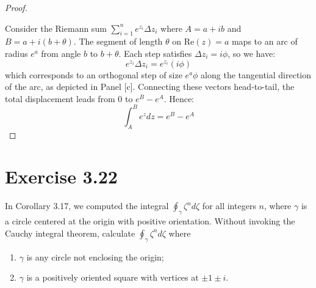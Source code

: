 \documentclass{article}
\begin{document}
\begin{proof}
\begin{center}
  \end{center}

  \vspace{1em}

  Consider the Riemann sum $\sum_{i=1}^{n} e^{z_i}\Delta z_i$ where
  $A = a+ib$ and $B = a+i(b+\theta)$. The segment of length
  $\theta$ on $\text{Re}(z) = a$ maps to an arc of radius $e^a$
  from angle $b$ to $b+\theta$. Each step satisfies $\Delta z_i =
  i\phi$, so we have:
  \[
    e^{z_i}\Delta z_i = e^{z_i}(i\phi)
  \]
  which corresponds to an orthogonal step of size $e^a\phi$ along
  the tangential direction of the arc, as depicted in Panel [c].
  Connecting these vectors head-to-tail, the total displacement
  leads from $0$ to $e^B - e^A$. Hence:
  \[
    \int_A^B e^z dz = e^B - e^A
  \]

\end{proof}

\section{Exercise 3.22}

In Corollary 3.17, we computed the integral $\oint_\gamma \zeta^n
d\zeta$ for all integers $n$, where $\gamma$ is a circle centered at
the origin with positive orientation. Without invoking the Cauchy
integral theorem, calculate $\oint_\gamma \zeta^n d\zeta$ where
\begin{enumerate}
  \item[(a)] $\gamma$ is any circle not enclosing the origin;
  \item[(b)] $\gamma$ is a positively oriented square with vertices
    at $\pm 1 \pm i$.
\end{enumerate}
\end{document}

